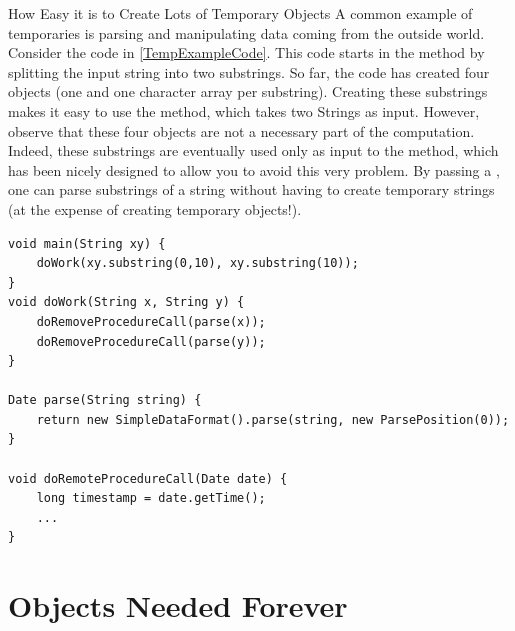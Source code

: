\begin{example}{How Easy it is to Create Lots of Temporary Objects}
A common example of temporaries is parsing
and manipulating data coming from the outside world. 
Consider the code in \autoref{TempExampleCode}. This code starts in
the  method by splitting the input string into two substrings. So
far, the code has created four objects (one  and one character
array per substring). 
Creating these substrings makes it easy to use the  method, which
takes two Strings as input. However, observe
that these four objects are not a necessary part of the computation. Indeed,
these substrings are eventually used only as input to the
  method, which has been nicely designed to
allow you to avoid this very problem. By passing a , one
can parse substrings of a string without having to create temporary strings (at
the expense of creating temporary  objects!).
\end{example}



\begin{lstlisting}[float,caption=Code that constructs 8 temporary objects to handle two dates.,label=TempExampleCode]
void main(String xy) {
	doWork(xy.substring(0,10), xy.substring(10));
}	
void doWork(String x, String y) {
	doRemoveProcedureCall(parse(x));
	doRemoveProcedureCall(parse(y));
}
	
Date parse(String string) {
	return new SimpleDataFormat().parse(string, new ParsePosition(0));
}

void doRemoteProcedureCall(Date date) {
	long timestamp = date.getTime();
	...
}
\end{lstlisting}







\section{Objects Needed Forever}
\label{forever-lifetime}

